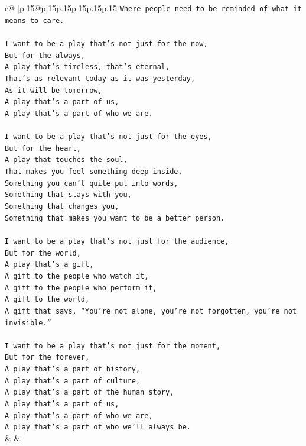 \documentclass{article}
\begin{document}
{\begin{supertabular}{c@{$\;$}|p{.15\linewidth}@{}p{.15\linewidth}p{.15\linewidth}p{.15\linewidth}p{.15\linewidth}p{.15\linewidth}}
{{{\texttt{Where people need to be reminded of what it means to care.} \\
\\ 
\texttt{I want to be a play that’s not just for the now,} \\
\texttt{But for the always,} \\
\texttt{A play that’s timeless, that’s eternal,} \\
\texttt{That’s as relevant today as it was yesterday,} \\
\texttt{As it will be tomorrow,} \\
\texttt{A play that’s a part of us,} \\
\texttt{A play that’s a part of who we are.} \\
\\ 
\texttt{I want to be a play that’s not just for the eyes,} \\
\texttt{But for the heart,} \\
\texttt{A play that touches the soul,} \\
\texttt{That makes you feel something deep inside,} \\
\texttt{Something you can’t quite put into words,} \\
\texttt{Something that stays with you,} \\
\texttt{Something that changes you,} \\
\texttt{Something that makes you want to be a better person.} \\
\\ 
\texttt{I want to be a play that’s not just for the audience,} \\
\texttt{But for the world,} \\
\texttt{A play that’s a gift,} \\
\texttt{A gift to the people who watch it,} \\
\texttt{A gift to the people who perform it,} \\
\texttt{A gift to the world,} \\
\texttt{A gift that says, “You’re not alone, you’re not forgotten, you’re not invisible.”} \\
\\ 
\texttt{I want to be a play that’s not just for the moment,} \\
\texttt{But for the forever,} \\
\texttt{A play that’s a part of history,} \\
\texttt{A play that’s a part of culture,} \\
\texttt{A play that’s a part of the human story,} \\
\texttt{A play that’s a part of us,} \\
\texttt{A play that’s a part of who we are,} \\
\texttt{A play that’s a part of who we’ll always be.} \\
            }
        }
    }
    & & \\ \\


\end{supertabular}}
\end{document}
